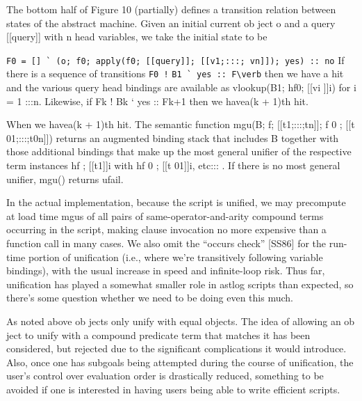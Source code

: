 The bottom half of Figure 10 (partially) defines a
transition relation between states of the abstract machine.
Given an initial current ob ject o and a query
[[query]] with n head variables, we take the initial state
to be

\verb|F0 = [] ` (o; f0; apply(f0; [[query]]; [[v1;:::; vn]]); yes) :: no|
If there is a sequence of transitions
\verb|F0 !|
\verb|B1 ` yes :: F\verb|
then we have a hit and the various query head bindings
are available as vlookup(B1; hf0; [[vi ]]i) for i = 1 :::n. Likewise, if
Fk !
Bk ` yes :: Fk+1
then we havea(k + 1)th hit.

When we havea(k + 1)th hit.
The semantic function
mgu(B; f; [[t1;:::;tn]]; f 0 ; [[t
01;:::;t0n]])
returns an augmented binding stack that includes B
together with those additional bindings that make up
the most general unifier of the respective term instances
hf ; [[t1]]i with hf 0 ; [[t
01]]i, etc::: . If there is no
most general unifier, mgu() returns ufail.

In the actual implementation, because the script is
unified, we may precompute at load time mgus of all
pairs of same-operator-and-arity compound terms occurring
in the script, making clause invocation no more
expensive than a function call in many cases. We also
omit the ``occurs check'' [SS86] for the run-time portion
of unification (i.e., where we're transitively following
variable bindings), with the usual increase in
speed and infinite-loop risk. Thus far, unification has
played a somewhat smaller role in astlog scripts than
expected, so there's some question whether we need to
be doing even this much.

As noted above ob jects only unify with equal objects.
The idea of allowing an ob ject to unify with
a compound predicate term that matches it has been
considered, but rejected due to the significant complications
it would introduce. Also, once one has subgoals
being attempted during the course of unification, the
user's control over evaluation order is drastically reduced,
something to be avoided if one is interested in
having users being able to write efficient scripts.

\label{crewfig10}

\secup %